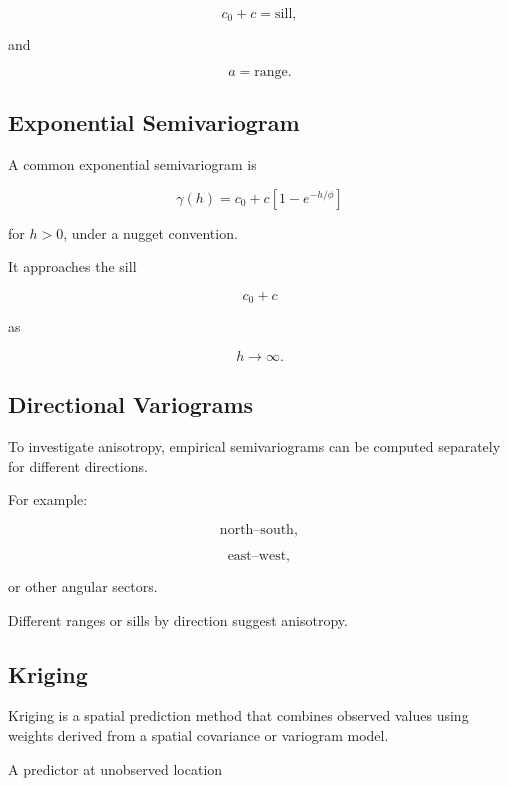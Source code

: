 \[
c_0+c
=
\text{sill},
\]

and

\[
a
=
\text{range}.
\]

\subsection{Exponential Semivariogram}
\label{subsec:exponential-semivariogram}

A common exponential semivariogram is

\[
\boxed{
\gamma(h)
=
c_0
+
c
\left[
1-e^{-h/\phi}
\right]
}
\]

for \(h>0\), under a nugget convention.

It approaches the sill

\[
c_0+c
\]

as

\[
h\to\infty.
\]

\subsection{Directional Variograms}
\label{subsec:directional-variograms}

To investigate anisotropy, empirical semivariograms can be computed
separately for different directions.

For example:

\[
\boxed{
\text{north--south},
}
\]

\[
\boxed{
\text{east--west},
}
\]

or other angular sectors.

Different ranges or sills by direction suggest anisotropy.

\subsection{Kriging}
\label{subsec:kriging}

Kriging is a spatial prediction method that combines observed values
using weights derived from a spatial covariance or variogram model.

A predictor at unobserved location

